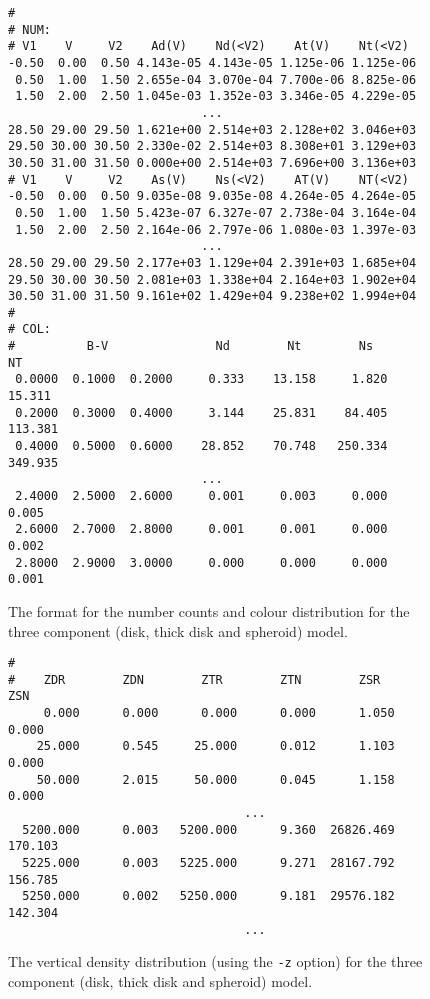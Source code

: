 \documentclass[11pt,twoside]{article}
\begin{document}
\begin{figure}[p]
\begin{center}
\begin{verbatim}
#
# NUM:
# V1    V     V2    Ad(V)    Nd(<V2)    At(V)    Nt(<V2)
-0.50  0.00  0.50 4.143e-05 4.143e-05 1.125e-06 1.125e-06
 0.50  1.00  1.50 2.655e-04 3.070e-04 7.700e-06 8.825e-06
 1.50  2.00  2.50 1.045e-03 1.352e-03 3.346e-05 4.229e-05
                           ...
28.50 29.00 29.50 1.621e+00 2.514e+03 2.128e+02 3.046e+03
29.50 30.00 30.50 2.330e-02 2.514e+03 8.308e+01 3.129e+03
30.50 31.00 31.50 0.000e+00 2.514e+03 7.696e+00 3.136e+03
# V1    V     V2    As(V)    Ns(<V2)    AT(V)    NT(<V2)
-0.50  0.00  0.50 9.035e-08 9.035e-08 4.264e-05 4.264e-05
 0.50  1.00  1.50 5.423e-07 6.327e-07 2.738e-04 3.164e-04
 1.50  2.00  2.50 2.164e-06 2.797e-06 1.080e-03 1.397e-03
                           ...
28.50 29.00 29.50 2.177e+03 1.129e+04 2.391e+03 1.685e+04
29.50 30.00 30.50 2.081e+03 1.338e+04 2.164e+03 1.902e+04
30.50 31.00 31.50 9.161e+02 1.429e+04 9.238e+02 1.994e+04
#
# COL:
#          B-V               Nd        Nt        Ns        NT
 0.0000  0.1000  0.2000     0.333    13.158     1.820    15.311
 0.2000  0.3000  0.4000     3.144    25.831    84.405   113.381
 0.4000  0.5000  0.6000    28.852    70.748   250.334   349.935
                           ...
 2.4000  2.5000  2.6000     0.001     0.003     0.000     0.005
 2.6000  2.7000  2.8000     0.001     0.001     0.000     0.002
 2.8000  2.9000  3.0000     0.000     0.000     0.000     0.001
\end{verbatim}
\end{center}
\caption{The format for the number counts and colour distribution for the 
three component (disk, thick disk and spheroid) model.}
\end{figure}

\begin{figure}[p]
\begin{center}
\begin{verbatim}
#
#    ZDR        ZDN        ZTR        ZTN        ZSR        ZSN
     0.000      0.000      0.000      0.000      1.050      0.000 
    25.000      0.545     25.000      0.012      1.103      0.000 
    50.000      2.015     50.000      0.045      1.158      0.000 
                                 ...
  5200.000      0.003   5200.000      9.360  26826.469    170.103 
  5225.000      0.003   5225.000      9.271  28167.792    156.785 
  5250.000      0.002   5250.000      9.181  29576.182    142.304 
                                 ...
\end{verbatim}
\end{center}
\caption{The vertical density distribution (using the {\tt -z} option) for 
the three component (disk, thick disk and spheroid) model.}
\end{figure}
\end{document}
